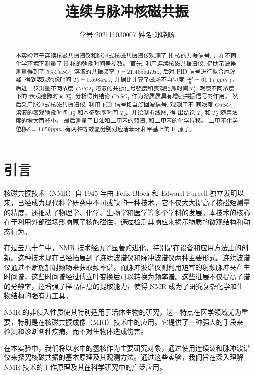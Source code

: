 \documentclass[12pt,a4paper]{article}
\title{\vspace{-4cm}\Large 连续与脉冲核磁共振}  %
\author{\kaishu 学号:202111030007 \hspace{2cm} 姓名:郑晓旸}   %
\date{}
\begin{document}
\maketitle

\begin{abstract}
    本实验基于连续核磁共振谱仪和脉冲式核磁共振谱仪观测了 H 核的共振信号, 并在不同化学环境下测量了 H 核的弛豫时间等参数。
    首先, 利用连续核磁共振谱仪, 借助示波器测量得到了 5\%$CuS O_4$ 溶液的共振频率 $f = 21.4655 MHz$, 后对 PID 信号进行拟合尾波峰, 得到表观弛豫时间
    $T_2^{\star} = 0.5984ms$, 并据此计算了磁场不均匀度 $\frac{\Delta B}{B}= 61.1(ppm)$。
    后进一步测量不同浓度 $CuS O_4$ 溶液的共振信号强度和表观弛豫时间 $T_2^{\star}$, 观察不同浓度下的
    表观弛豫时间 $T_2^{\star}$, 分析得出结论 $CuS O_4$ 作为溶质质具有增强共振信号的作用。
    然后采用脉冲式核磁共振谱仪, 利用 FID 信号和自旋回波信号, 观测了不
    同浓度 $CuS O_4$ 溶液的表观弛豫时间 $T_2^{\star}$ 和本征弛豫时间 $T_2$。并绘制折线图, 得
    出结论 $T_2$ 和 $T_2^{\star}$ 随着浓度的增大而减小。
    最后测量了甘油和二甲苯的频谱, 和二甲苯的化学位移。 二甲苯化学位移$\delta =4.659ppm$, 有两种等效氢分别对应着苯环和甲基上的 H 原子。
\end{abstract}

\section{引言}
核磁共振技术（NMR）自 1945 年由 Felix Bloch 和 Edward Purcell 独立发明\cite{Bloch1946,Purcell1946}以来，已经成为现代科学研究中不可或缺的一种技术。它不仅大大提高了核磁矩测量的精度，还推动了物理学、化学、生物学和医学等多个学科的发展。本技术的核心在于利用外部磁场影响原子核的磁性，通过检测其响应来揭示物质的微观结构和动态行为。

在过去几十年中，NMR 技术经历了显著的进化，特别是在设备和应用方法上的创新\cite{Levitt2008}。这种技术现在已经拓展到了连续波谱仪和脉冲波谱仪两种主要形式。连续波谱仪通过不断施加射频场来获取频率谱，而脉冲波谱仪则利用短暂的射频脉冲来产生时间谱，这些时间谱经过傅立叶变换后可以转换为频率谱。这些进展不仅提高了谱的分辨率，还增强了样品信息的提取能力，使得 NMR 成为了研究复杂化学和生物结构的强有力工具。

NMR 的非侵入性质使其特别适用于活体生物的研究，这一特点在医学领域尤为重要，特别是在核磁共振成像（MRI）技术中的应用\cite{Lauterbur1973}。它提供了一种强大的手段来检测和诊断各种疾病，而不对生物体造成伤害。

在本实验中，我们将以水中的氢核作为主要研究对象，通过使用连续波和脉冲波谱仪来探究核磁共振的基本原理及其观测方法。通过这些实验，我们旨在深入理解 NMR 技术的工作原理及其在科学研究中的广泛应用。
\end{document}
